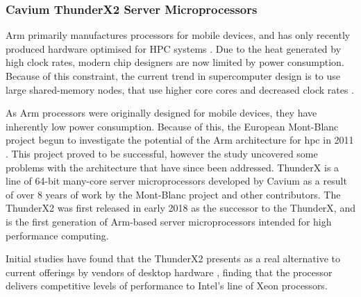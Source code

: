 \documentclass[a4paper,11pt]{report}
\begin{document}


\subsubsection{Cavium ThunderX2 Server Microprocessors}
Arm primarily manufactures processors for mobile devices, and has only recently produced hardware optimised for HPC systems \cite{mcintosh2018performance}. Due to the heat generated by high clock rates, modern chip designers are now limited by power consumption. Because of this constraint, the current trend in supercomputer design is to use large shared-memory nodes, that use higher core cores and decreased clock rates \cite{kindratenko2011trends}. 
\par
As Arm processors were originally designed for mobile devices, they have inherently low power consumption. Because of this, the European Mont-Blanc project begun to investigate the potential of the Arm architecture for \gls{hpc} in 2011 \cite{Rajovic:2016:MPA:3014904.3014955}. This project proved to be successful, however the study uncovered some problems with the architecture that have since been addressed. ThunderX is a line of 64-bit many-core server microprocessors developed by Cavium as a result of over 8 years of work by the Mont-Blanc project and other contributors. The ThunderX2 was first released in early 2018 as the successor to the ThunderX, and is the first generation of Arm-based server microprocessors intended for high performance computing.
\par
Initial studies have found that the ThunderX2 presents as a real alternative to current offerings by vendors of desktop hardware \cite{calore2018advanced, mcintosh2018performance}, finding that the processor delivers competitive levels of performance to Intel's line of Xeon processors. 
\par
\end{document}
